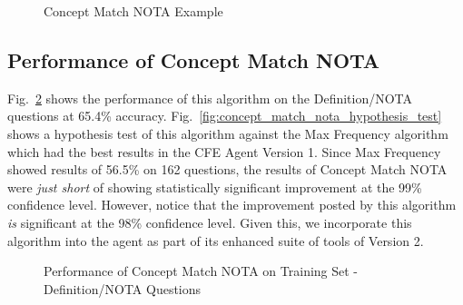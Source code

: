 \begin{figure}
\centering
\vspace{0.75in}
\caption{Concept Match NOTA Example}
\label{fig:concept_match_nota_example}
\end{figure}

\subsection{Performance of Concept Match NOTA}

Fig.~\ref{fig:concept_match_nota_training_set_performance} shows the performance of this algorithm on the Definition/NOTA questions at 65.4\% accuracy.  Fig.~\ref{fig:concept_match_nota_hypothesis_test} shows a hypothesis test of this algorithm against the Max Frequency algorithm which had the best results in the CFE Agent Version 1.  Since Max Frequency showed results of 56.5\% on 162 questions, the results of Concept Match NOTA were \emph{just short} of showing statistically significant improvement at the 99\% confidence level.  However, notice that the improvement posted by this algorithm \emph{is} significant at the 98\% confidence level.  Given this, we incorporate this algorithm into the agent as part of its enhanced suite of tools of Version 2.

\begin{figure}
\centering
\vspace{0.75in}
\caption{Performance of Concept Match NOTA on Training Set - Definition/NOTA Questions}
\label{fig:concept_match_nota_training_set_performance}
\end{figure}



